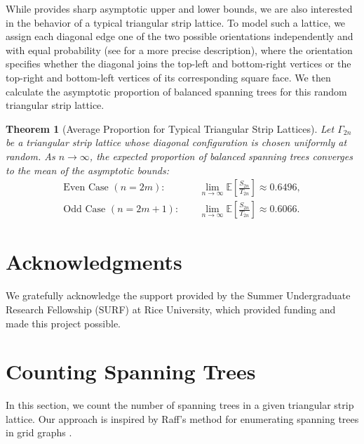 \documentclass{amsart}
\newtheorem{theorem}{Theorem}[section]
\theoremstyle{definition}
\begin{document}
While  provides sharp asymptotic upper and lower bounds, we are also interested in the behavior of a typical triangular strip lattice. To model such a lattice, we assign each diagonal edge one of the two possible orientations independently and with equal probability (see  for a more precise description), where the orientation specifies whether the diagonal joins the top-left and bottom-right vertices or the top-right and bottom-left vertices of its corresponding square face. We then calculate the asymptotic proportion of balanced spanning trees for this random triangular strip lattice.

\begin{theorem}[Average Proportion for Typical Triangular Strip Lattices]\label{thm:expectedvalue}
Let $\Gamma_{2n}$ be a triangular strip lattice whose diagonal configuration is chosen uniformly at random. As $n \to \infty$, the expected proportion of balanced spanning trees converges to the mean of the asymptotic bounds:
\begin{align*}
\text{Even Case $(n = 2m)$: } \quad &\lim_{n \to \infty} \mathbb{E}\left[\frac{S_{2n}}{T_{2n}}\right] \approx 0.6496, \\[0.5em]
\text{Odd Case $(n = 2m + 1)$: } \quad &\lim_{n \to \infty} \mathbb{E}\left[\frac{S_{2n}}{T_{2n}}\right] \approx 0.6066.
\end{align*}
\end{theorem}

\section*{Acknowledgments}

We gratefully acknowledge the support provided by the Summer Undergraduate Research Fellowship (SURF) at Rice University, which provided funding and made this project possible.

\section{Counting Spanning Trees}


In this section, we count the number of spanning trees in a given triangular strip lattice. Our approach is inspired by Raff's method for enumerating spanning trees in grid graphs \cite{raff}.
\end{document}
